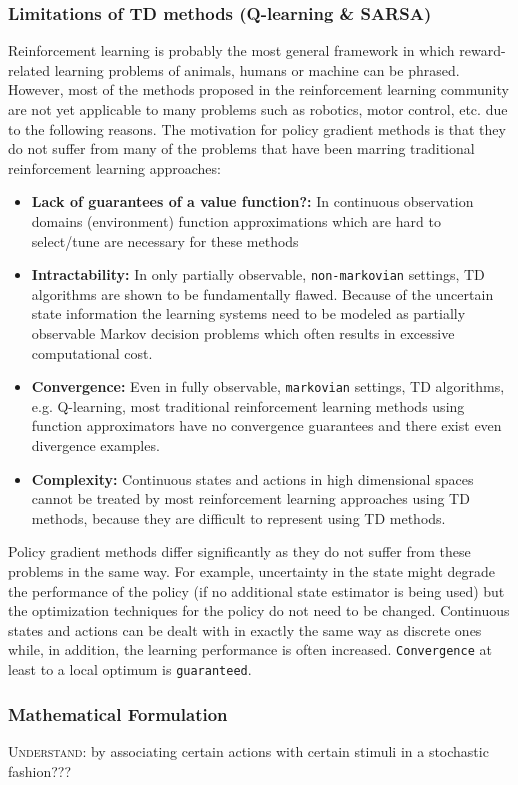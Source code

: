 \documentclass[11pt]{article}
\begin{document}
\subsubsection{Limitations of TD methods (Q-learning \& SARSA)}
Reinforcement learning is probably the most general framework in which reward-related learning problems of animals, humans or machine can be phrased. However, most of the methods proposed in the reinforcement learning community are not yet applicable to many problems such as robotics, motor control, etc. due to the following reasons.
The motivation for policy gradient methods is that they do not suffer from many of the problems that have been marring traditional reinforcement learning approaches:
\begin{itemize}
\item \textbf{Lack of guarantees of a value function?:} In continuous observation domains (environment) function approximations which are hard to select/tune are necessary for these methods
\item \textbf{Intractability:} In only partially observable, \texttt{non-markovian} settings, TD algorithms are shown to be fundamentally flawed. Because of the uncertain state information the learning systems need to be modeled as partially observable Markov decision problems which often results in excessive computational cost. 
\item \textbf{Convergence:} Even in fully observable, \texttt{markovian} settings, TD algorithms, e.g. Q-learning, most traditional reinforcement learning methods using function approximators have no convergence guarantees and there exist even divergence examples. 
\item \textbf{Complexity:} Continuous states and actions in high dimensional spaces cannot be treated by most reinforcement learning approaches using TD methods, because they are difficult to represent using TD methods.
\end{itemize}
Policy gradient methods differ significantly as they do not suffer from these problems in the same way. For example, uncertainty in the state might degrade the performance of the policy (if no additional state estimator is being used) but the optimization techniques for the policy do not need to be changed. Continuous states and actions can be dealt with in exactly the same way as discrete ones while, in addition, the learning performance is often increased. \texttt{Convergence} at least to a local optimum is \texttt{guaranteed}.

\subsubsection{Mathematical Formulation}
\textsc{Understand:} by associating certain actions with certain stimuli in a stochastic fashion???
\end{document}
